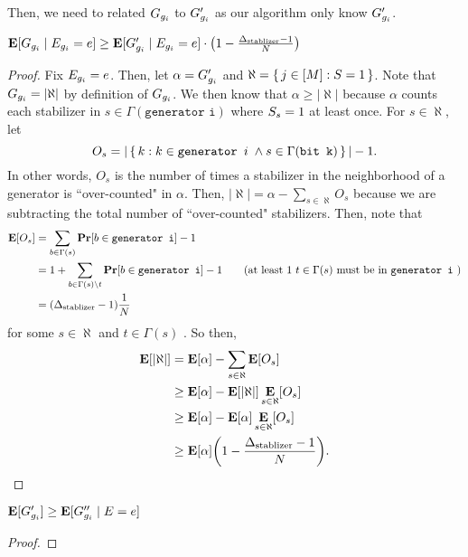Then, we need to related $G_{g_i}$ to $G'_{g_i}$ as our algorithm
only know $G'_{g_i}$.

\begin{lemma}{$\E[\genscoreRVCorrected_{g_i} \mid \lyingGenerator_{g_i} = e] \geq \E[\generatorscoreRV_{g_i} \mid \lyingGenerator_{g_i} = e] \cdot \mleft(1 - \frac{\DegStable - 1}{N}\mright)$}
\begin{proof}
	Fix $E_{g_i} = e$. Then, let $\alpha = G'_{g_i}$ and $\aleph = \set{j \in [M] : S= 1}$. 
	Note that $G_{g_i} = |\aleph|$ by definition of $G_{g_i}$.
	We then know that $\alpha \geq |\aleph|$ because $\alpha$ counts each stabilizer
	in $s \in \Gamma(\texttt{generator i})$ where $S_s = 1$ at least once.
	For $s \in \aleph$, let
	$$
		O_s = |\set{k : k \in \texttt{generator }i\; \wedge s \in \Gamma(\texttt{bit k})}| - 1.
	$$
	In other words, $O_s$ is the number of times a stabilizer in the neighborhood of a generator is
	``over-counted" in $\alpha$. Then, %
	$
		|\aleph| = \alpha - \sum_{s \in \aleph}O_s
	$ because we are subtracting the total number of ``over-counted" stabilizers.
	Then, note that
	\begin{align*}
		\E[O_s] &= \sum_{b \in \Gamma(s)} \Pr[b \in \texttt{generator i}] - 1\\
			&= 1 + \sum_{b \in \Gamma(s) \setminus t} \Pr[b \in \texttt{generator i}] - 1 \tag{at least $1$ $t \in \Gamma(s)$ must be in $\texttt{generator i}$ } \\
			&= \mleft(\DegStable - 1\mright) \frac{1}{N}
	\end{align*}
	for some $s \in \aleph$ and $t \in \Gamma(s)$ .
	So then, 
	\begin{align*}
		\E[|\aleph|] &= \E[\alpha] - \sum_{s \in \aleph}\E[O_s] \\
		&\geq \E[\alpha] - \E[|\aleph|] \E_{s \in \aleph}[O_s] \\
		&\geq \E[\alpha] - \E[\alpha] \E_{s \in \aleph}[O_s] \\
		&\geq \E[\alpha] \mleft(1 - \frac{\DegStable - 1}{N}\mright).
	\end{align*}
\end{proof}	
\end{lemma}

\begin{lemma}{$\operatorname*{\mathbf{E}}[G'_{g_i}] \geq \operatorname*{\mathbf{E}}[G''_{g_i} \mid E = e]$}
\begin{proof}
\end{proof}	
\end{lemma}

